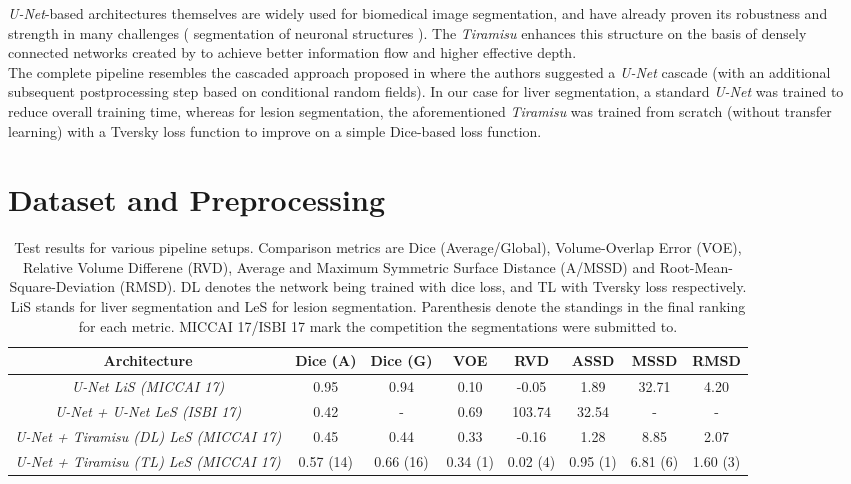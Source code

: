 \documentclass{article}
\begin{document}
\textit{U-Net}-based architectures themselves are widely used for biomedical image segmentation, and have already proven its robustness and strength in many challenges ( segmentation of neuronal structures \cite{NEURO}). The \textit{Tiramisu} \cite{tiramisu} enhances this structure on the basis of densely connected networks created by \cite{densenet} to achieve better information flow and higher effective depth. \\
The complete pipeline resembles the cascaded approach proposed in \cite{LITS} where the authors suggested a \textit{U-Net} cascade (with an additional subsequent postprocessing step based on conditional random fields). In our case for liver segmentation, a standard \textit{U-Net} was trained to reduce overall training time, whereas for lesion segmentation, the aforementioned \textit{Tiramisu} was trained from scratch (without transfer learning) with a Tversky loss function to improve on a simple Dice-based loss function.

\section{Dataset and Preprocessing}
\label{sec:prepro}


\begin{table*}[h]
\centering
\begin{tabular}{c|c|c|c|c|c|c|c}

\textbf{Architecture} & \textbf{Dice (A)} & \textbf{Dice (G)} & \textbf{VOE} & \textbf{RVD} & \textbf{ASSD} & \textbf{MSSD} & \textbf{RMSD}\\
\hline
\textit{U-Net LiS (MICCAI 17)}& 0.95 & 0.94 & 0.10 & -0.05 & 1.89 & 32.71 & 4.20\\
\hline
\textit{U-Net + U-Net LeS (ISBI 17)}& 0.42 & - & 0.69 & 103.74 & 32.54 & - & -\\
\textit{U-Net + Tiramisu (DL) LeS (MICCAI 17)} & 0.45 & 0.44 & 0.33 & -0.16 & 1.28 & 8.85 & 2.07\\
\textit{U-Net + Tiramisu (TL) LeS (MICCAI 17)} & 0.57 (14)& 0.66 (16)& 0.34 (1)& 0.02 (4)& 0.95 (1)& 6.81 (6)& 1.60 (3)\\
\hline
\end{tabular}
\caption{Test results for various pipeline setups. Comparison metrics are Dice (Average/Global), Volume-Overlap Error (VOE), Relative Volume Differene (RVD), Average and Maximum Symmetric Surface Distance (A/MSSD) and Root-Mean-Square-Deviation (RMSD). DL denotes the network being trained with dice loss, and TL with Tversky loss respectively. LiS stands for liver segmentation and LeS for lesion segmentation. Parenthesis denote the standings in the final ranking for each metric. MICCAI 17/ISBI 17 mark the competition the segmentations were submitted to. }
\label{tab:res}
\end{table*}
\end{document}
